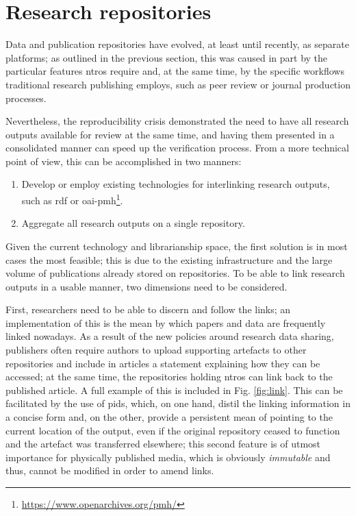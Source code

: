 \clearpage

\section{Research repositories}
\label{sec:research}

Data and publication repositories have evolved, at least until recently, as separate platforms; as outlined in the previous section, this was caused in part by the particular features \glspl{ntro} require and, at the same time, by the specific workflows traditional research publishing employs, such as peer review or journal production processes.

Nevertheless, the reproducibility crisis demonstrated the need to have all research outputs available for review at the same time, and having them presented in a consolidated manner can speed up the verification process. From a more technical point of view, this can be accomplished in two manners:
\begin{enumerate}
    \item Develop or employ existing technologies for interlinking research outputs, such as \gls{rdf} or \gls{oai}-\gls{pmh}\footnote{\url{https://www.openarchives.org/pmh/}}.
    \item Aggregate all research outputs on a single repository.
\end{enumerate}

Given the current technology and librarianship space, the first solution is in most cases the most feasible; this is due to the existing infrastructure and the large volume of publications already stored on repositories. To be able to link research outputs in a usable manner, two dimensions need to be considered.

First, researchers need to be able to discern and follow the links; an implementation of this is the mean by which papers and data are frequently linked nowadays. As a result of the new policies around research data sharing, publishers often require authors to upload supporting artefacts to other repositories\cite{elsdat,scidat} and include in articles a statement explaining how they can be accessed; at the same time, the repositories holding \glspl{ntro} can link back to the published article. A full example of this is included in Fig. \ref{fig:link}. This can be facilitated by the use of \glspl{pid}, which, on one hand, distil the linking information in a concise form and, on the other, provide a persistent mean of pointing to the current location of the output, even if the original repository ceased to function and the artefact was transferred elsewhere; this second feature is of utmost importance for physically published media, which is obviously \emph{immutable} and thus, cannot be modified in order to amend links.

